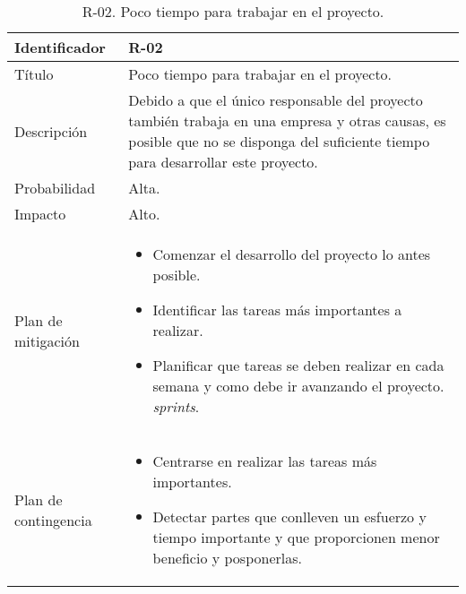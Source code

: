 \begin{table}[H]
  \centering
\begin{tabularx}{1\textwidth} { 
  | >{\centering\arraybackslash}X 
  | >{\centering\arraybackslash}X 
  |  }
 \hline
  Identificador & R-02 \\
 \hline
 Título & Poco tiempo para trabajar en el proyecto. \\
 \hline
 Descripción  & Debido a que el único responsable del proyecto también trabaja en una empresa y otras causas, es posible que no se disponga del suficiente tiempo para desarrollar este proyecto.   \\
\hline
 Probabilidad  & Alta.   \\
 \hline
 Impacto  & Alto.   \\
 \hline
 Plan de mitigación  & \begin{itemize}
     \item Comenzar el desarrollo del proyecto lo antes posible. 
   \item  Identificar las tareas más importantes a realizar.
      \item Planificar que tareas se deben realizar en cada semana y como debe ir avanzando el proyecto.
\textit{sprints}.
    
 \end{itemize}   \\
 \hline
 Plan de contingencia  & \begin{itemize}
     \item Centrarse en realizar las tareas más importantes. 
     \item Detectar partes que conlleven un esfuerzo y tiempo importante y que proporcionen menor beneficio y posponerlas.

      
 \end{itemize}   \\
 

  \hline
\end{tabularx}
\caption{R-02. Poco tiempo para trabajar en el proyecto.}
\label{table:R-02}
\end{table}





